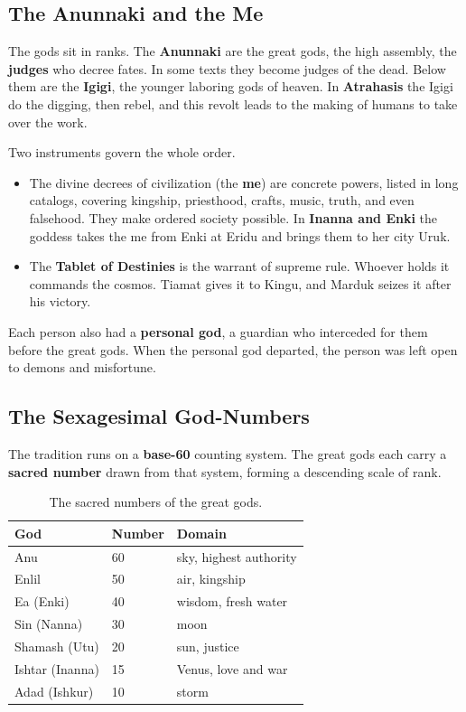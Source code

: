 \subsection{The Anunnaki and the Me}

The gods sit in ranks. The \textbf{Anunnaki} are the great gods, the high assembly, the \textbf{judges} who decree fates. In some texts they become judges of the dead. Below them are the \textbf{Igigi}, the younger laboring gods of heaven. In \textbf{Atrahasis} the Igigi do the digging, then rebel, and this revolt leads to the making of humans to take over the work.

Two instruments govern the whole order.

\begin{itemize}
 \item The divine decrees of civilization (the \textbf{me}) are concrete powers, listed in long catalogs, covering kingship, priesthood, crafts, music, truth, and even falsehood. They make ordered society possible. In \textbf{Inanna and Enki} the goddess takes the me from Enki at Eridu and brings them to her city Uruk.
 \item The \textbf{Tablet of Destinies} is the warrant of supreme rule. Whoever holds it commands the cosmos. Tiamat gives it to Kingu, and Marduk seizes it after his victory.
\end{itemize}

Each person also had a \textbf{personal god}, a guardian who interceded for them before the great gods. When the personal god departed, the person was left open to demons and misfortune.

\subsection{The Sexagesimal God-Numbers}

The tradition runs on a \textbf{base-60} counting system. The great gods each carry a \textbf{sacred number} drawn from that system, forming a descending scale of rank.

\begin{longtable}{L{3.5cm} L{2cm} L{6cm}}
\caption{The sacred numbers of the great gods.}\\
\toprule
\textbf{God} & \textbf{Number} & \textbf{Domain} \\
\midrule
Anu & 60 & sky, highest authority \\
Enlil & 50 & air, kingship \\
Ea (Enki) & 40 & wisdom, fresh water \\
Sin (Nanna) & 30 & moon \\
Shamash (Utu) & 20 & sun, justice \\
Ishtar (Inanna) & 15 & Venus, love and war \\
Adad (Ishkur) & 10 & storm \\
\bottomrule
\end{longtable}

